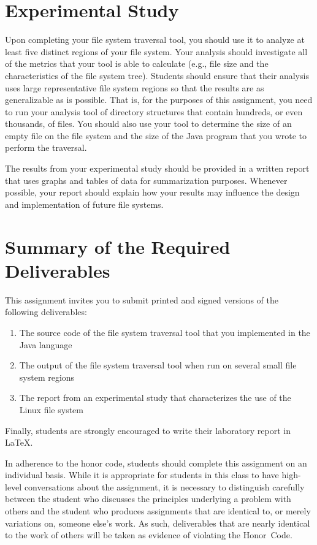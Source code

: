 \section*{Experimental Study}

Upon completing your file system traversal tool, you should use it to analyze at least five distinct regions of your file system.
Your analysis should investigate all of the metrics that your tool is able to calculate (e.g., file size and the characteristics
of the file system tree). Students should ensure that their analysis uses large representative file system regions so that the results
are as generalizable as is possible. That is, for the purposes of this assignment, you need to run your analysis tool of directory
structures that contain hundreds, or even thousands, of files. You should also use your tool to determine the size of an empty
file on the file system and the size of the Java program that you wrote to perform the traversal.

The results from your experimental study should be provided in a written report that uses graphs and tables of data for
summarization purposes. Whenever possible, your report should explain how your results may influence the design and implementation
of future file systems.

\section*{Summary of the Required Deliverables}

  This assignment invites you to submit printed and signed versions of the following deliverables: 

  \begin{enumerate}
    \item The source code of the file system traversal tool that you implemented in the Java language
    \item The output of the file system traversal tool when run on several small file system regions
    \item The report from an experimental study that characterizes the use of the Linux file system
  \end{enumerate}

  Finally, students are strongly encouraged to write their laboratory report in \LaTeX.

  In adherence to the honor code, students should complete this assignment on an individual basis. While it is appropriate for
  students in this class to have high-level conversations about the assignment, it is necessary to distinguish carefully between the
  student who discusses the principles underlying a problem with others and the student who produces assignments that are identical
  to, or merely variations on, someone else's work.  As such, deliverables that are nearly identical to the work of others will be
  taken as evidence of violating the \mbox{Honor Code}.  



  
